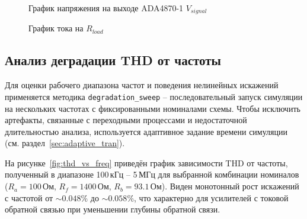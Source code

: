 \documentclass[a4paper, 12pt]{article}
\begin{document}
\begin{figure}[H]
\centering
{}
\caption{График напряжения на выходе ADA4870-1 \(V_{signal}\)}
\end{figure}

\begin{figure}[H]
\centering
{}
\caption{График тока на \(R_{load}\)}
\end{figure}

\subsection{Анализ деградации THD от частоты}
\label{sec:degradation}

Для оценки рабочего диапазона частот и поведения нелинейных искажений применяется методика \texttt{degradation\_sweep} – последовательный запуск симуляции на нескольких частотах с фиксированными номиналами схемы. Чтобы исключить артефакты, связанные с переходными процессами и недостаточной длительностью анализа, используется адаптивное задание времени симуляции (см. раздел~\ref{sec:adaptive_tran}).

На рисунке~\ref{fig:thd_vs_freq} приведён график зависимости THD от частоты, полученный в диапазоне 100\,кГц – 5\,МГц для выбранной комбинации номиналов (\(R_a=100\)\,Ом, \(R_f=1400\)\,Ом, \(R_b=93.1\)\,Ом). Виден монотонный рост искажений с частотой от \(\sim 0.048\%\) до \(\sim 0.058\%\), что характерно для усилителей с токовой обратной связью при уменьшении глубины обратной связи.
\end{document}
